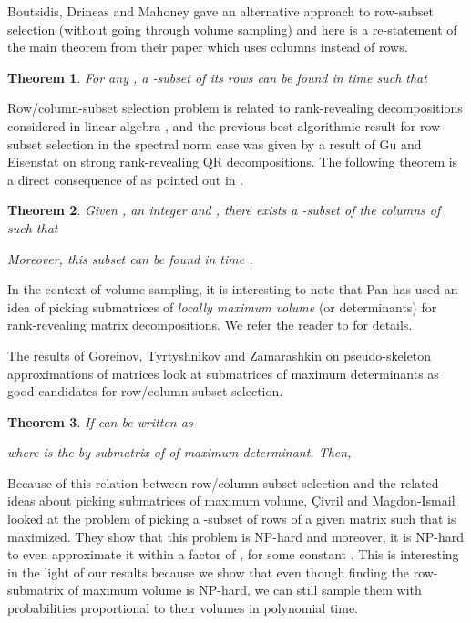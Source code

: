 \documentclass[11pt]{article}
\newtheorem{theorem}{Theorem}
\begin{document}
Boutsidis, Drineas and Mahoney \cite{BDM} gave an alternative approach to row-subset selection (without going through volume sampling) and here is a re-statement of the main theorem from their paper which uses columns instead of rows.


\begin{theorem} \cite{BDM} \label{thm:bdm-soda}
For any , a -subset  of its rows can be found in time  such that

\end{theorem}

Row/column-subset selection problem is related to rank-revealing decompositions considered in linear algebra \cite{GE,P}, and the previous best algorithmic result for row-subset selection in the spectral norm case was given by a result of Gu and Eisenstat \cite{GE} on strong rank-revealing QR decompositions. The following theorem is a direct consequence of \cite{GE} as pointed out in \cite{BDM}.
\begin{theorem}
Given , an integer  and , there exists a -subset  of the columns of  such that

Moreover, this subset  can be found in time .
\end{theorem}
In the context of volume sampling, it is interesting to note that Pan \cite{P} has used an idea of picking submatrices of \emph{locally maximum volume} (or determinants) for rank-revealing matrix decompositions. We refer the reader to \cite{P} for details.


The results of Goreinov, Tyrtyshnikov and Zamarashkin \cite{GT,GTZ} on pseudo-skeleton approximations of matrices look at submatrices of maximum determinants as good candidates for row/column-subset selection.
\begin{theorem} \cite{GT}
If  can be written as

where  is the  by  submatrix of  of maximum determinant. Then,

\end{theorem}

Because of this relation between row/column-subset selection and the related ideas about picking submatrices of maximum volume, \c{C}ivril and Magdon-Ismail \cite{CM1,CM2} looked at the problem of picking a -subset  of rows of a given matrix  such that  is maximized. They show that this problem is NP-hard \cite{CM1} and moreover, it is NP-hard to even approximate it within a factor of , for some constant  \cite{CM2}. This is interesting in the light of our results because we show that even though finding the row-submatrix of maximum volume is NP-hard, we can still sample them with probabilities proportional to their volumes in polynomial time.
\end{document}
